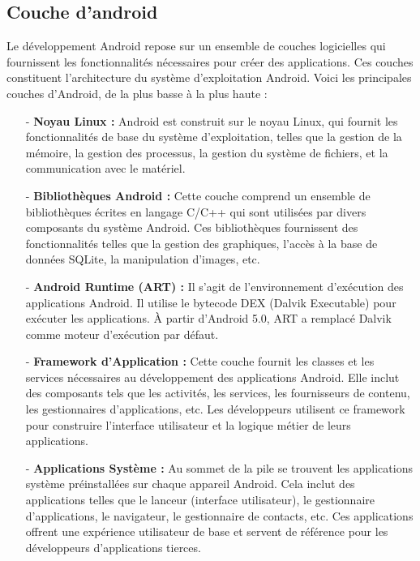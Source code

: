 \subsection{Couche d’android }
Le développement Android repose sur un ensemble de couches logicielles qui fournissent les fonctionnalités nécessaires pour créer des applications. Ces couches constituent l'architecture du système d'exploitation Android. Voici les principales couches d'Android, de la plus basse à la plus haute :
   \begin{itemize}
    \item[-]\textbf{Noyau Linux : } Android est construit sur le noyau Linux, qui fournit les fonctionnalités de base du système d'exploitation, telles que la gestion de la mémoire, la gestion des processus, la gestion du système de fichiers, et la communication avec le matériel.
    \item[-]\textbf{Bibliothèques Android :}  Cette couche comprend un ensemble de bibliothèques écrites en langage C/C++ qui sont utilisées par divers composants du système Android. Ces bibliothèques fournissent des fonctionnalités telles que la gestion des graphiques, l'accès à la base de données SQLite, la manipulation d'images, etc.
    \item[-]\textbf{Android Runtime (ART) :} Il s'agit de l'environnement d'exécution des applications Android. Il utilise le bytecode DEX (Dalvik Executable) pour exécuter les applications. À partir d'Android 5.0, ART a remplacé Dalvik comme moteur d'exécution par défaut.
    \item[-]\textbf{Framework d'Application : } Cette couche fournit les classes et les services nécessaires au développement des applications Android. Elle inclut des composants tels que les activités, les services, les fournisseurs de contenu, les gestionnaires d'applications, etc. Les développeurs utilisent ce framework pour construire l'interface utilisateur et la logique métier de leurs applications.
    \item[-]\textbf{Applications Système :}   Au sommet de la pile se trouvent les applications système préinstallées sur chaque appareil Android. Cela inclut des applications telles que le lanceur (interface utilisateur), le gestionnaire d'applications, le navigateur, le gestionnaire de contacts, etc. Ces applications offrent une expérience utilisateur de base et servent de référence pour les développeurs d'applications tierces.
    \end{itemize}
